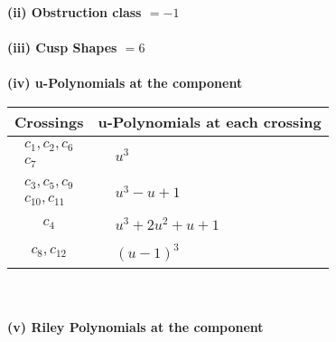 \documentclass[1p]{elsarticle_modified}
\theoremstyle{definition}
\begin{document}
\flushleft \textbf{(ii) Obstruction class $= -1$}\\~\\
\flushleft \textbf{(iii) Cusp Shapes $= 6$}\\~\\
\newpage\renewcommand{\arraystretch}{1}
\flushleft \textbf{(iv) u-Polynomials at the component}\newline \\
\begin{tabular}{m{50pt}|m{274pt}}
Crossings & \hspace{64pt}u-Polynomials at each crossing \\
\hline $$\begin{aligned}c_{1},c_{2},c_{6}\\c_{7}\end{aligned}$$&$\begin{aligned}
&u^3
\end{aligned}$\\
\hline $$\begin{aligned}c_{3},c_{5},c_{9}\\c_{10},c_{11}\end{aligned}$$&$\begin{aligned}
&u^3- u+1
\end{aligned}$\\
\hline $$\begin{aligned}c_{4}\end{aligned}$$&$\begin{aligned}
&u^3+2 u^2+u+1
\end{aligned}$\\
\hline $$\begin{aligned}c_{8},c_{12}\end{aligned}$$&$\begin{aligned}
&(u-1)^3
\end{aligned}$\\
\hline
\end{tabular}\\~\\
\newpage\renewcommand{\arraystretch}{1}
\flushleft \textbf{(v) Riley Polynomials at the component}\newline \\
\end{document}
